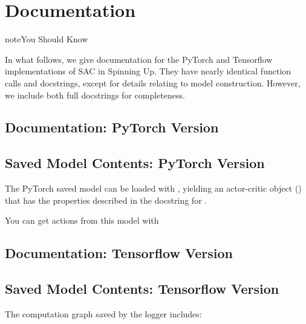 \documentclass[letterpaper,10pt,english]{sphinxmanual}
\begin{document}
\section{Documentation}
\label{\detokenize{algorithms/lac:documentation}}
\begin{sphinxadmonition}{note}{You Should Know}

In what follows, we give documentation for the PyTorch and Tensorflow implementations of SAC in Spinning Up. They have nearly identical function calls and docstrings, except for details relating to model construction. However, we include both full docstrings for completeness.
\end{sphinxadmonition}


\subsection{Documentation: PyTorch Version}
\label{\detokenize{algorithms/lac:documentation-pytorch-version}}

\subsection{Saved Model Contents: PyTorch Version}
\label{\detokenize{algorithms/lac:saved-model-contents-pytorch-version}}
The PyTorch saved model can be loaded with , yielding an actor-critic object () that has the properties described in the docstring for .

You can get actions from this model with

\begin{sphinxVerbatim}[commandchars=\\\{\}]
   
\end{sphinxVerbatim}


\subsection{Documentation: Tensorflow Version}
\label{\detokenize{algorithms/lac:documentation-tensorflow-version}}

\subsection{Saved Model Contents: Tensorflow Version}
\label{\detokenize{algorithms/lac:saved-model-contents-tensorflow-version}}
The computation graph saved by the logger includes:
\end{document}
